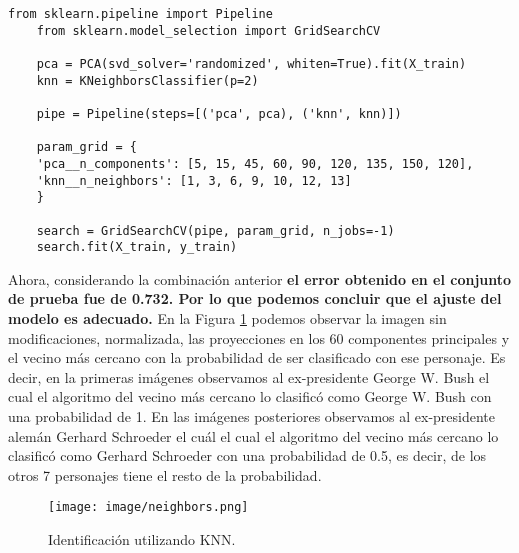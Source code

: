 \documentclass[paper=letter, fontsize=11pt]{scrartcl}
\numberwithin{equation}{section} %
\numberwithin{figure}{section} %
\numberwithin{table}{section} %
\begin{document}
\begin{lstlisting}[style=customc,basicstyle=\scriptsize]
    from sklearn.pipeline import Pipeline
    from sklearn.model_selection import GridSearchCV

    pca = PCA(svd_solver='randomized', whiten=True).fit(X_train)
    knn = KNeighborsClassifier(p=2)

    pipe = Pipeline(steps=[('pca', pca), ('knn', knn)])

    param_grid = {
    'pca__n_components': [5, 15, 45, 60, 90, 120, 135, 150, 120],
    'knn__n_neighbors': [1, 3, 6, 9, 10, 12, 13]
    }

    search = GridSearchCV(pipe, param_grid, n_jobs=-1)
    search.fit(X_train, y_train)
\end{lstlisting}  
Ahora, considerando la combinación anterior \textbf{el error obtenido en el conjunto de prueba fue de 0.732. Por lo que podemos concluir que el ajuste del modelo es adecuado.} En la Figura \ref{fig:neighbors} podemos observar la imagen sin modificaciones, normalizada, las proyecciones en los 60 componentes principales y el vecino más cercano con la probabilidad de ser clasificado con ese personaje. Es decir, en la primeras imágenes observamos al ex-presidente George W. Bush el cual el algoritmo del vecino más cercano lo clasificó como George W. Bush con una probabilidad de 1. En las imágenes posteriores observamos al ex-presidente alemán Gerhard Schroeder el cuál el cual el algoritmo del vecino más cercano lo clasificó como Gerhard Schroeder con una probabilidad de 0.5, es decir, de los otros 7 personajes tiene el resto de la probabilidad. 
\begin{figure}[H]
    \centering
    \texttt{[image: image/neighbors.png]}
    \caption{Identificación utilizando KNN.}
    \label{fig:neighbors}
\end{figure}
\end{document}

